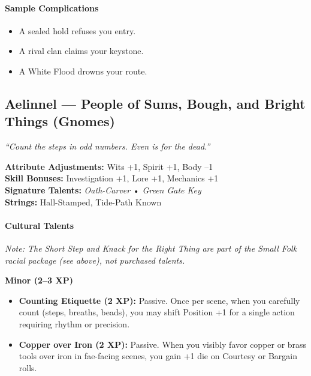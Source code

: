 \paragraph{Sample Complications}
\begin{itemize}
  \item A sealed hold refuses you entry.
  \item A rival clan claims your keystone.
  \item A White Flood drowns your route.
\end{itemize}

\clearpage

\subsection{Aelinnel --- People of Sums, Bough, and Bright Things (Gnomes)}
\label{sec:aelinnel-detailed}

\emph{``Count the steps in odd numbers. Even is for the dead.''}

\begin{tcolorbox}[colback=black!3!white,colframe=black!40!white,title=Aelinnel at a Glance,breakable]
\textbf{Attribute Adjustments:} Wits +1, Spirit +1, Body --1 \\
\textbf{Skill Bonuses:} Investigation +1, Lore +1, Mechanics +1 \\
\textbf{Signature Talents:} \emph{Oath-Carver} • \emph{Green Gate Key} \\
\textbf{Strings:} Hall-Stamped, Tide-Path Known
\end{tcolorbox}

\paragraph{Cultural Talents}
\textit{Note: The \emph{Short Step} and \emph{Knack for the Right Thing} are part of the Small Folk racial package (see above), not purchased talents.}

\textbf{Minor (2--3 XP)}
\begin{itemize}
  \item \textbf{Counting Etiquette (2 XP):} Passive. Once per scene, when you carefully count (steps, breaths, beads), you may shift Position +1 for a single action requiring rhythm or precision.
  \item \textbf{Copper over Iron (2 XP):} Passive. When you visibly favor copper or brass tools over iron in fae-facing scenes, you gain +1 die on Courtesy or Bargain rolls.
\end{itemize}

